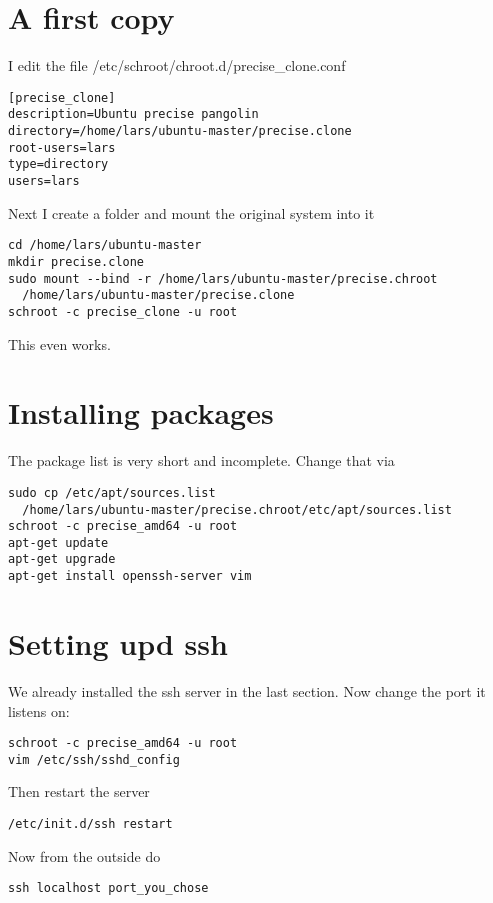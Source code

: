 \documentclass[a4paper]{article}
\begin{document}
\section{A first copy}
I edit the file /etc/schroot/chroot.d/precise\_clone.conf

\begin{verbatim}
[precise_clone]
description=Ubuntu precise pangolin
directory=/home/lars/ubuntu-master/precise.clone
root-users=lars
type=directory
users=lars
\end{verbatim}

Next I create a folder and mount the original system into it

\begin{verbatim}
cd /home/lars/ubuntu-master
mkdir precise.clone
sudo mount --bind -r /home/lars/ubuntu-master/precise.chroot 
  /home/lars/ubuntu-master/precise.clone
schroot -c precise_clone -u root
\end{verbatim}

This even works.

\section{Installing packages}
The package list is very short and incomplete. Change that via

\begin{verbatim}
sudo cp /etc/apt/sources.list 
  /home/lars/ubuntu-master/precise.chroot/etc/apt/sources.list
schroot -c precise_amd64 -u root
apt-get update
apt-get upgrade
apt-get install openssh-server vim
\end{verbatim}

\section{Setting upd ssh}

We already installed the ssh server in the last section. Now change the port it listens on:

\begin{verbatim}
schroot -c precise_amd64 -u root
vim /etc/ssh/sshd_config
\end{verbatim}

Then restart the server

\begin{verbatim}
/etc/init.d/ssh restart
\end{verbatim}

Now from the outside do

\begin{verbatim}
ssh localhost port_you_chose
\end{verbatim}
\end{document}
